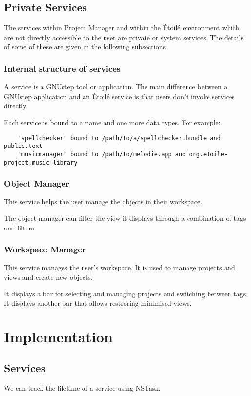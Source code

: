 \documentclass[11pt]{report}
\newcommand{\etoile}{\'Etoil\'e\xspace}
\newcommand{\proman}{Project Manager\xspace}
\newcommand{\gnustep}{GNUstep\xspace}
\begin{document}
\section{Private Services}

The services within \proman and within the \etoile environment which are not directly accessible to the user are private or system services. The details of some of these are given in the following subsections

\subsection{Internal structure of services}

A service is a \gnustep tool or application. The main difference between a \gnustep application and an \etoile service is that users don't invoke services directly. 

Each service is bound to a name and one more data types. For example:
\begin{verbatim}
	'spellchecker' bound to /path/to/a/spellchecker.bundle and public.text 
	'musicmanager' bound to /path/to/melodie.app and org.etoile-project.music-library
\end{verbatim}
\subsection{Object Manager}

This service helps the user manage the objects in their workspace.

The object manager can filter the view it displays through a combination of tags and filters. 

\subsection{Workspace Manager}

This service manages the user's workspace. It is used to manage projects and views and create new objects.

It displays a bar for selecting and managing projects and switching between tags. It displays another bar that allows restroring minimised views.

\chapter{Implementation}
\section{Services}
We can track the lifetime of a service using NSTask.
\end{document}
